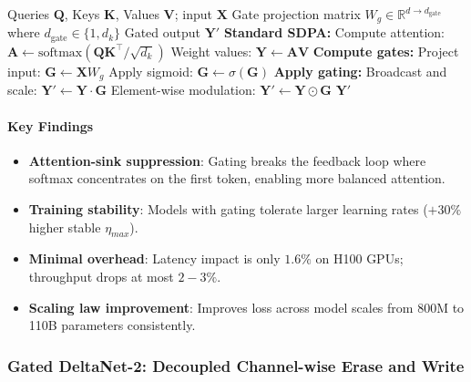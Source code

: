 \begin{algorithm}[H]
\caption{Gated Softmax Attention (Post-SDPA)}
\begin{algorithmic}[1]
\Require Queries $\mathbf{Q}$, Keys $\mathbf{K}$, Values $\mathbf{V}$; input $\mathbf{X}$
\Require Gate projection matrix $W_g \in \mathbb{R}^{d \to d_{\text{gate}}}$ where $d_{\text{gate}} \in \{1, d_k\}$
\Ensure Gated output $\mathbf{Y}'$
\State \textbf{Standard SDPA:}
\State Compute attention: $\mathbf{A} \gets \text{softmax}(\mathbf{Q}\mathbf{K}^\top / \sqrt{d_k})$ 
\State Weight values: $\mathbf{Y} \gets \mathbf{A} \mathbf{V}$
\State \textbf{Compute gates:}
\State Project input: $\mathbf{G} \gets \mathbf{X} W_g$  
\State Apply sigmoid: $\mathbf{G} \gets \sigma(\mathbf{G})$ 
\State \textbf{Apply gating:}
    \State Broadcast and scale: $\mathbf{Y}' \gets \mathbf{Y} \cdot \mathbf{G}$ 
\Else
    \State Element-wise modulation: $\mathbf{Y}' \gets \mathbf{Y} \odot \mathbf{G}$ 
\EndIf
\Return $\mathbf{Y}'$
\end{algorithmic}
\end{algorithm}

\paragraph{Key Findings}

\begin{itemize}[leftmargin=*]
    \item \textbf{Attention-sink suppression}: Gating breaks the feedback loop where softmax concentrates on the first token, enabling more balanced attention.
    \item \textbf{Training stability}: Models with gating tolerate larger learning rates ($+30\%$ higher stable $\eta_{max}$).
    \item \textbf{Minimal overhead}: Latency impact is only $1.6\%$ on H100 GPUs; throughput drops at most $2-3\%$.
    \item \textbf{Scaling law improvement}: Improves loss across model scales from 800M to 110B parameters consistently.
\end{itemize}

\normalsize

\subsubsection{Gated DeltaNet-2: Decoupled Channel-wise Erase and Write}

